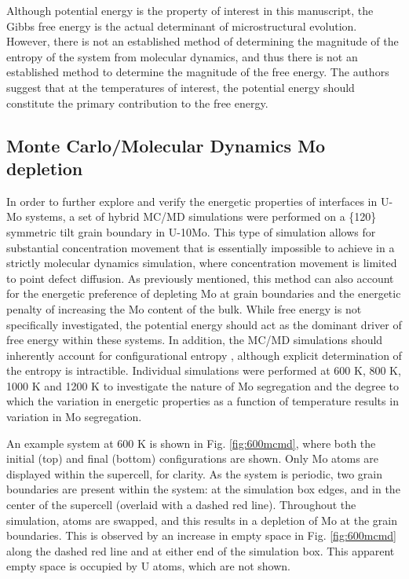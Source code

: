 \documentclass[review]{elsarticle}
\begin{document}
\FloatBarrier

Although potential energy is the property of interest in this manuscript, the Gibbs free energy is the actual determinant of microstructural evolution. However, there is not an established method of determining the magnitude of the entropy of the system from molecular dynamics, and thus there is not an established method to determine the magnitude of the free energy. The authors suggest that at the temperatures of interest, the potential energy should constitute the primary contribution to the free energy.

\subsection{Monte Carlo/Molecular Dynamics Mo depletion}
In order to further explore and verify the energetic properties of interfaces in U-Mo systems, a set of hybrid MC/MD simulations were performed on a \{120\} symmetric tilt grain boundary in U-10Mo. This type of simulation allows for substantial concentration movement that is essentially impossible to achieve in a strictly molecular dynamics simulation, where concentration movement is limited to point defect diffusion. As previously mentioned, this method can also account for the energetic preference of depleting Mo at grain boundaries and the energetic penalty of increasing the Mo content of the bulk. While free energy is not specifically investigated, the potential energy should act as the dominant driver of free energy within these systems. In addition, the MC/MD simulations should inherently account for configurational entropy \cite{tepesch1998},  although explicit determination of the entropy is intractible. Individual simulations were performed at 600 K, 800 K, 1000 K and 1200 K to investigate the nature of Mo segregation and the degree to which the variation in energetic properties as a function of temperature results in variation in Mo segregation. 

An example system at 600 K is shown in Fig. \ref{fig:600mcmd}, where both the initial (top) and final (bottom) configurations are shown. Only Mo atoms are displayed within the supercell, for clarity. As the system is periodic, two grain boundaries are present within the system: at the simulation box edges, and in the center of the supercell (overlaid with a dashed red line). Throughout the simulation, atoms are swapped, and this results in a depletion of Mo at the grain boundaries. This is observed by an increase in empty space in Fig. \ref{fig:600mcmd} along the dashed red line and at either end of the simulation box. This apparent empty space is occupied by U atoms, which are not shown.
\end{document}
